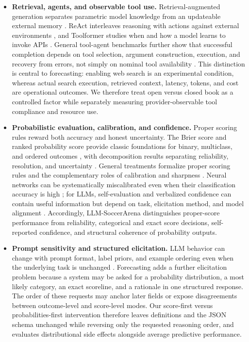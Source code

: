 \documentclass[sigconf,review]{acmart}
\newcommand{\arena}{\mbox{LLM-SoccerArena}\xspace}
\newenvironment{draftbullets}
  {\begin{itemize}[leftmargin=1.25em,itemsep=1.5pt,topsep=2pt,parsep=0pt,partopsep=0pt]}
  {\end{itemize}}
\begin{document}
\begin{draftbullets}
  \item \textbf{Retrieval, agents, and observable tool use.} Retrieval-augmented generation separates
  parametric model knowledge from an updateable external memory \citep{lewis_etal_2020}. ReAct
  interleaves reasoning with actions against external environments \citep{yao_etal_2023}, and
  Toolformer studies when and how a model learns to invoke APIs \citep{schick_etal_2023}. General
  tool-agent benchmarks further show that successful completion depends on tool selection, argument
  construction, execution, and recovery from errors, not simply on nominal tool availability
  \citep{wang_etal_2024_gta}. This distinction is central to forecasting: enabling web search is an
  experimental condition, whereas actual search execution, retrieved context, latency, tokens, and
  cost are operational outcomes. We therefore treat open versus closed book as a controlled factor
  while separately measuring provider-observable tool compliance and resource use.

  \item \textbf{Probabilistic evaluation, calibration, and confidence.} Proper scoring rules reward
  both accuracy and honest uncertainty. The Brier score and ranked probability score provide classic
  foundations for binary, multiclass, and ordered outcomes \citep{brier_1950,epstein_1969}, with
  decomposition results separating reliability, resolution, and uncertainty \citep{murphy_1973}.
  General treatments formalize proper scoring rules and the complementary roles of calibration and
  sharpness \citep{gneiting_raftery_2007,gneiting_etal_2007}. Neural networks can be systematically
  miscalibrated even when their classification accuracy is high \citep{guo_etal_2017}; for LLMs,
  self-evaluation and verbalized confidence can contain useful information but depend on task,
  elicitation method, and model alignment \citep{kadavath_etal_2022,tian_etal_2023,xiong_etal_2024}.
  Accordingly, \arena distinguishes proper-score performance from reliability, categorical and exact
  score decisions, self-reported confidence, and structural coherence of probability outputs.

  \item \textbf{Prompt sensitivity and structured elicitation.} LLM behavior can change with prompt
  format, label priors, and example ordering even when the underlying task is unchanged
  \citep{zhao_etal_2021,lu_etal_2022}. Forecasting adds a further elicitation problem because a system
  may be asked for a probability distribution, a most likely category, an exact scoreline, and a
  rationale in one structured response. The order of these requests may anchor later fields or expose
  disagreements between outcome-level and score-level modes. Our score-first versus
  probabilities-first intervention therefore leaves definitions and the JSON schema unchanged while
  reversing only the requested reasoning order, and evaluates distributional side effects alongside
  average predictive performance.


\end{draftbullets}
\end{document}
